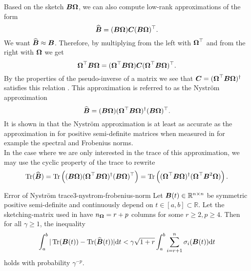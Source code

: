 Based on the sketch $\boldsymbol{B}\boldsymbol{\Omega}$, we can also compute low-rank approximations
of the form
\begin{equation}
    \widehat{\boldsymbol{B}} = (\boldsymbol{B} \boldsymbol{\Omega}) \boldsymbol{C} (\boldsymbol{B} \boldsymbol{\Omega})^{\top}.
    \label{equ:3-nystrom-nystrom-general}
\end{equation}
We want $\widehat{\boldsymbol{B}} \approx \boldsymbol{B}$. Therefore, by multiplying 
from the left with $\boldsymbol{\Omega}^{\top}$ and from the right with $\boldsymbol{\Omega}$
we get
\begin{equation}
    \boldsymbol{\Omega}^{\top} \boldsymbol{B} \boldsymbol{\Omega} = (\boldsymbol{\Omega}^{\top} \boldsymbol{B} \boldsymbol{\Omega}) \boldsymbol{C} (\boldsymbol{\Omega}^{\top} \boldsymbol{B} \boldsymbol{\Omega})^{\top}.
    \label{equ:3-nystrom-nystrom-unknown}
\end{equation}
By the properties of the pseudo-inverse of a matrix we see that
$\boldsymbol{C} = (\boldsymbol{\Omega}^{\top} \boldsymbol{B} \boldsymbol{\Omega})^{\dagger}$ satisfies this
relation \cite[section~3.1]{lin2017randomized}.
This approximation is referred to as the Nystr\"om approximation \cite{gittens2013nystrom,lin2017randomized}
\begin{equation}
    \widehat{\boldsymbol{B}} = (\boldsymbol{B} \boldsymbol{\Omega}) (\boldsymbol{\Omega}^{\top} \boldsymbol{B} \boldsymbol{\Omega})^{\dagger} (\boldsymbol{B} \boldsymbol{\Omega})^{\top}.
    \label{equ:3-nystrom-nystrom}
\end{equation}
It is shown in \cite[lemma~5.2]{tropp2023randomized} that the Nystr\"om approximation
is at least as accurate as the approximation in 
for positive semi-definite matrices when measured in for example the spectral
and Frobenius norms.\\

In the case where we are only interested in the trace of this approximation,
we may use the cyclic property of the trace to rewrite
\begin{equation}
    \operatorname{Tr}(\widehat{\boldsymbol{B}})
        = \operatorname{Tr}\left((\boldsymbol{B} \boldsymbol{\Omega}) (\boldsymbol{\Omega}^{\top} \boldsymbol{B} \boldsymbol{\Omega})^{\dagger} (\boldsymbol{B} \boldsymbol{\Omega})^{\top} \right)
        = \operatorname{Tr}\left((\boldsymbol{\Omega}^{\top} \boldsymbol{B} \boldsymbol{\Omega})^{\dagger} (\boldsymbol{\Omega}^{\top} \boldsymbol{B}^2 \boldsymbol{\Omega}) \right).
    \label{equ:3-nystrom-nystrom-trace}
\end{equation}

\begin{theorem}{Error of Nystr\"om trace}{3-nystrom-frobenius-norm}
    Let $\boldsymbol{B}(t) \in \mathbb{R}^{n \times n}$ be symmetric positive semi-definite
    and continuously depend on $t \in [a,b] \subset \mathbb{R}$. Let the \gls{sketching-matrix}
    used in  have
    $n_{\boldsymbol{\Omega}} = r + p$ columns for some $r \geq 2, p \geq 4$. Then
    for all $\gamma \geq 1$, the inequality
    \begin{equation}
        \int_{a}^{b} | \operatorname{Tr}(\boldsymbol{B}(t)) - \operatorname{Tr}(\widehat{\boldsymbol{B}}(t))| \mathrm{d}t
            < \gamma \sqrt{1 + r} \int_{a}^{b} \sum_{i = r+1}^n \sigma_i(\boldsymbol{B}(t)) \mathrm{d}t
    \end{equation}
    holds with probability $\gamma^{-p}$.
\end{theorem}

